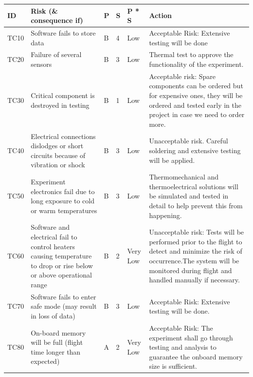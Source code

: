 \documentclass[a4paper,12pt,twoside]{article}
\providecommand{\DIFaddtex}[1]{{\protect\color{blue}\uwave{#1}}} %
\providecommand{\DIFaddbegin}{} %
\providecommand{\DIFaddend}{} %
\providecommand{\DIFadd}[1]{\texorpdfstring{\DIFaddtex{#1}}{#1}} %
\newcommand{\DIFaddincludegraphics}[2][]{{\color{blue}\fbox{\DIFOincludegraphics[#1]{#2}}}} %
\DeclareRobustCommand{\DIFaddbegin}{\DIFOaddbegin \let\includegraphics\DIFaddincludegraphics} %
\DeclareRobustCommand{\DIFaddend}{\DIFOaddend \let\includegraphics\DIFOincludegraphics} %
\begin{document}
\begin{landscape}
\begin{longtable}{|m{}| m{} |m{} |m{}|m{}| m{}|}

\hline
\textbf{ID} & \textbf{Risk (\& consequence if)} & \textbf{P} & \textbf{S} & \textbf{P * S} & \textbf{Action} \\ \hline
TC10 & Software fails to store data & B & 4 & \cellcolor[HTML]{FCFF2F}Low & Acceptable Risk: Extensive testing will be done \\ \hline
TC20 & Failure of several sensors & B & 3 & \cellcolor[HTML]{FCFF2F}Low & \DIFaddbegin \DIFadd{Acceptable Risk: }\DIFaddend Thermal test to approve the functionality of the experiment. \\ \hline
TC30 & Critical component is destroyed in testing & B & 1 & \cellcolor[HTML]{FCFF2F}Low & Acceptable risk: Spare components can be ordered but for expensive ones, they will be ordered and tested early in the project in case we need to order more. \\ \hline
TC40 & Electrical connections dislodges or short circuits because of vibration or shock & B & 3 & \cellcolor[HTML]{FCFF2F}Low & Unacceptable risk. Careful soldering and extensive testing will be applied. \\ \hline
TC50 & Experiment electronics fail due to long exposure to cold or warm temperatures & B & 3 & \cellcolor[HTML]{FCFF2F}Low & \DIFaddbegin \DIFadd{Unacceptable Risk: }\DIFaddend Thermomechanical and thermoelectrical solutions will be simulated and tested in detail to help prevent this from happening. \\ \hline
TC60 & Software and electrical fail to control heaters causing temperature to drop or rise below or above operational range & B & 2 & \cellcolor[HTML]{34FF34}Very Low & Unacceptable risk: Tests will be performed prior to the flight to detect and minimize the risk of occurrence.The system will be monitored during flight and handled manually if necessary. \\ \hline
TC70 & Software fails to enter safe mode (may result in loss of data) & B & 3 & \cellcolor[HTML]{FCFF2F}Low & Acceptable Risk: Extensive testing will be done. \\ \hline
TC80 & On-board memory will be full (flight time longer than expected) & A & 2 & \cellcolor[HTML]{34FF34}Very Low & Acceptable Risk: The experiment shall go through testing and analysis to guarantee the onboard memory size is sufficient.\\ \hline

\end{longtable}
\end{landscape}
\end{document}
